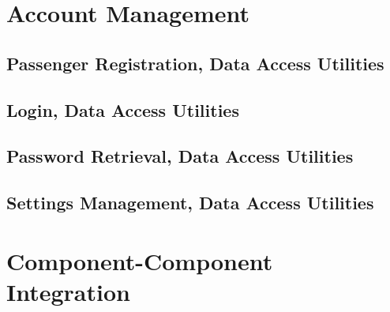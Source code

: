 \documentclass[11pt,oneside,a4paper]{report}
\begin{document}
\chapter{Account Management}
\section{Passenger Registration, Data Access Utilities}

\section{Login, Data Access Utilities}

\section{Password Retrieval, Data Access Utilities}

\section{Settings Management, Data Access Utilities}


\chapter{Component-Component Integration}
\end{document}

